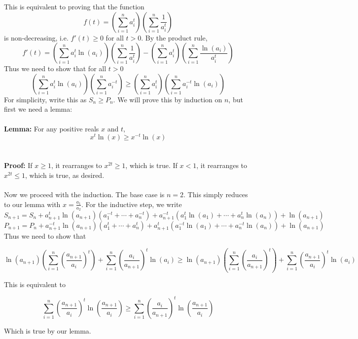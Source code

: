 \documentclass[11pt]{scrartcl}
\begin{document}
\begin{soln}
  This is equivalent to proving that the function
$$f(t)=\left(\sum_{i=1}^n a_i^t\right)\left(\sum_{i=1}^n \frac{1}{a_i^t}\right)$$
is non-decreasing, i.e. $f'(t)\ge 0$ for all $t>0$. By the product rule,
$$f'(t)=\left(\sum_{i=1}^n a_i^t\ln(a_i)\right)\left(\sum_{i=1}^n \frac{1}{a_i^t}\right)-\left(\sum_{i=1}^n a_i^t\right)\left(\sum_{i=1}^n \frac{\ln(a_i)}{a_i^t}\right)$$
Thus we need to show that for all $t>0$
$$\left(\sum_{i=1}^n a_i^t\ln(a_i)\right)\left(\sum_{i=1}^n a_i^{-t}\right)\ge \left(\sum_{i=1}^n a_i^t\right)\left(\sum_{i=1}^n a_i^{-t}\ln(a_i)\right)$$
For simplicity, write this as $S_n\ge P_n$. We will prove this by induction on $n$, but first we need a lemma:
\\ \\
\textbf{Lemma:}  For any positive reals $x$ and $t$,
$$x^t\ln(x)\ge x^{-t}\ln(x)$$
\\ \\
\textbf{Proof:} If $x\ge 1$, it rearranges to $x^{2t}\ge 1$, which is true. If $x<1$, it rearranges to $x^{2t}\le 1$, which is true, as desired.
\\ \\
Now we proceed with the induction. The base case is $n=2$. This simply reduces to our lemma with $x=\frac{a_1}{a_2}$. For the inductive step, we write
$$S_{n+1}=S_n+a_{n+1}^t\ln(a_{n+1})(a_1^{-t}+\cdots+a_n^{-t})+a_{n+1}^{-t}(a_1^t\ln(a_1)+\cdots+a_n^t\ln(a_n))+\ln(a_{n+1})$$
$$P_{n+1}=P_n+a_{n+1}^{-t}\ln(a_{n+1})(a_1^t+\cdots+a_n^t)+a_{n+1}^t(a_1^{-t}\ln(a_1)+\cdots+a_n^{-t}\ln(a_n))+\ln(a_{n+1})$$
Thus we need to show that

$$\ln(a_{n+1})\left(\sum_{i=1}^n \left(\frac{a_{n+1}}{a_i}\right)^t \right)+\sum_{i=1}^n \left(\frac{a_i}{a_{n+1}}\right)^t\ln(a_i)\ge \ln(a_{n+1})\left(\sum_{i=1}^n \left(\frac{a_i}{a_{n+1}}\right)^t\right)+\sum_{i=1}^n \left(\frac{a_{n+1}}{a_i}\right)^t\ln(a_i)$$

This is equivalent to

$$\sum_{i=1}^n \left(\frac{a_{n+1}}{a_i}\right)^t \ln\left(\frac{a_{n+1}}{a_i}\right)\ge \sum_{i=1}^n \left(\frac{a_{i}}{a_{n+1}}\right)^t \ln\left(\frac{a_{n+1}}{a_i}\right)$$

Which is true by our lemma.
\end{soln}
\end{document}
